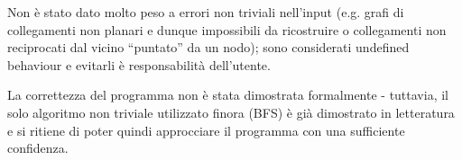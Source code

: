 \documentclass[a4paper]{article}
\begin{document}
Non \`e stato dato molto peso a errori non triviali nell'input (e.g. grafi di collegamenti non planari e dunque impossibili da ricostruire o collegamenti non reciprocati dal vicino ``puntato'' da un nodo); sono considerati undefined behaviour e evitarli \`e responsabilit\`a dell'utente.

La correttezza del programma non \`e stata dimostrata formalmente - tuttavia, il solo algoritmo non triviale utilizzato finora (BFS) \`e gi\`a dimostrato in letteratura e si ritiene di poter quindi approcciare il programma con una sufficiente confidenza.

{}

\end{document}
